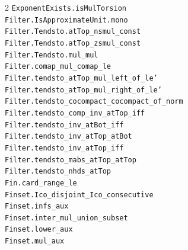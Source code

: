 \documentclass[10pt,a4paper]{article}
\begin{document}
\begin{multicols}{2}
\texttt{ExponentExists.\allowbreak{}isMulTorsion} \\
\texttt{Filter.\allowbreak{}IsApproximateUnit.\allowbreak{}mono} \\
\texttt{Filter.\allowbreak{}Tendsto.\allowbreak{}atTop\_nsmul\_const} \\
\texttt{Filter.\allowbreak{}Tendsto.\allowbreak{}atTop\_zsmul\_const} \\
\texttt{Filter.\allowbreak{}Tendsto.\allowbreak{}mul\_mul} \\
\texttt{Filter.\allowbreak{}comap\_mul\_comap\_le} \\
\texttt{Filter.\allowbreak{}tendsto\_atTop\_mul\_left\_of\_le'} \\
\texttt{Filter.\allowbreak{}tendsto\_atTop\_mul\_right\_of\_le'} \\
\texttt{Filter.\allowbreak{}tendsto\_cocompact\_cocompact\_of\_norm} \\
\texttt{Filter.\allowbreak{}tendsto\_comp\_inv\_atTop\_iff} \\
\texttt{Filter.\allowbreak{}tendsto\_inv\_atBot\_iff} \\
\texttt{Filter.\allowbreak{}tendsto\_inv\_atTop\_atBot} \\
\texttt{Filter.\allowbreak{}tendsto\_inv\_atTop\_iff} \\
\texttt{Filter.\allowbreak{}tendsto\_mabs\_atTop\_atTop} \\
\texttt{Filter.\allowbreak{}tendsto\_nhds\_atTop} \\
\texttt{Fin.\allowbreak{}card\_range\_le} \\
\texttt{Finset.\allowbreak{}Ico\_disjoint\_Ico\_consecutive} \\
\texttt{Finset.\allowbreak{}infs\_aux} \\
\texttt{Finset.\allowbreak{}inter\_mul\_union\_subset} \\
\texttt{Finset.\allowbreak{}lower\_aux} \\
\texttt{Finset.\allowbreak{}mul\_aux} \\

\end{multicols}
\end{document}
